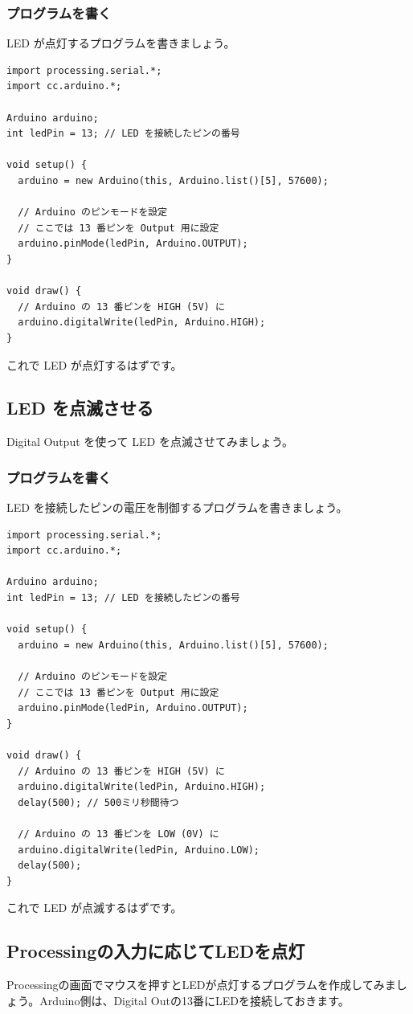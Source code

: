 \documentclass[11pt,a4paper]{jarticle}
\begin{document}
\subsubsection*{プログラムを書く}
LED が点灯するプログラムを書きましょう。
\begin{lstlisting}
import processing.serial.*;
import cc.arduino.*;
 
Arduino arduino;
int ledPin = 13; // LED を接続したピンの番号
 
void setup() {
  arduino = new Arduino(this, Arduino.list()[5], 57600);

  // Arduino のピンモードを設定
  // ここでは 13 番ピンを Output 用に設定
  arduino.pinMode(ledPin, Arduino.OUTPUT);
}
 
void draw() {
  // Arduino の 13 番ピンを HIGH (5V) に
  arduino.digitalWrite(ledPin, Arduino.HIGH);
}
\end{lstlisting}
これで LED が点灯するはずです。

\subsection*{LED を点滅させる}
Digital Output を使って LED を点滅させてみましょう。

\subsubsection*{プログラムを書く}
LED を接続したピンの電圧を制御するプログラムを書きましょう。
\begin{lstlisting}
import processing.serial.*;
import cc.arduino.*;
 
Arduino arduino;
int ledPin = 13; // LED を接続したピンの番号
 
void setup() {
  arduino = new Arduino(this, Arduino.list()[5], 57600);

  // Arduino のピンモードを設定
  // ここでは 13 番ピンを Output 用に設定
  arduino.pinMode(ledPin, Arduino.OUTPUT);
}
 
void draw() {
  // Arduino の 13 番ピンを HIGH (5V) に
  arduino.digitalWrite(ledPin, Arduino.HIGH);
  delay(500); // 500ミリ秒間待つ

  // Arduino の 13 番ピンを LOW (0V) に
  arduino.digitalWrite(ledPin, Arduino.LOW);
  delay(500);
}
\end{lstlisting}
これで LED が点滅するはずです。

\subsection*{Processingの入力に応じてLEDを点灯}
Processingの画面でマウスを押すとLEDが点灯するプログラムを作成してみましょう。Arduino側は、Digital Outの13番にLEDを接続しておきます。
\end{document}
